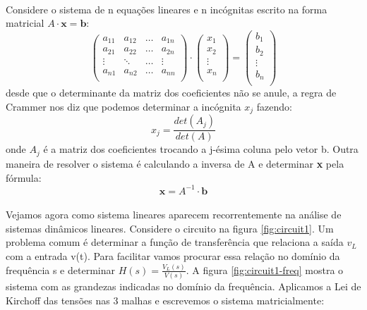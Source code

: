 \documentclass[a4paper,11pt]{article}
\begin{document}
\paragraph{}Considere o sistema de n equações lineares e
n incógnitas escrito na forma matricial $A\cdot \textbf{x} = \textbf{b}$:
\begin{displaymath}
    \left( \begin{array}{llll}
    a_{11} & a_{12} & \ldots & a_{1n} \\
    a_{21} & a_{22} & \ldots & a_{2n} \\
    \vdots & \ddots & \ldots & \vdots \\
    a_{n1} & a_{n2} & \ldots & a_{nn} \\
    \end{array}\right)
    \cdot
    \left( \begin{array}{l}
    x_1\\
    x_2\\
    \vdots\\
    x_n\\ 
    \end{array}\right)
    =
     \left( \begin{array}{l}
    b_1\\
    b_2\\
    \vdots\\
    b_n\\ 
    \end{array}\right)
\end{displaymath}
 desde que o determinante da matriz dos coeficientes não se anule, 
 a regra de Crammer nos diz que podemos determinar a incógnita $x_j$
 fazendo:
 \begin{equation}
   x_j = \frac{det(A_j)}{det(A)}
 \end{equation}
 onde $A_j$ é a matriz dos coeficientes
 trocando a j-ésima coluna pelo vetor b. Outra maneira de resolver o 
 sistema é calculando a inversa de A e determinar \textbf{x} pela fórmula:
 \begin{equation}
  \textbf{x} = A^{-1}\cdot \textbf{b}
 \end{equation}
 
 \paragraph{}Vejamos agora como sistema lineares aparecem recorrentemente 
 na análise de sistemas dinâmicos lineares. Considere o circuito na figura
 \ref{fig:circuit1}. Um problema comum é determinar a função de transferência
 que relaciona a saída $v_L$ com a entrada v(t). Para facilitar vamos procurar
 essa relação no domínio da frequência s e determinar $H(s) = \frac{V_L(s)}{V(s)}$.
 A figura \ref{fig:circuit1-freq} mostra o sistema com as grandezas indicadas 
 no domínio da frequência. Aplicamos
 a Lei de Kirchoff das tensões nas 3 malhas e escrevemos o sistema matricialmente:
 
\end{document}
